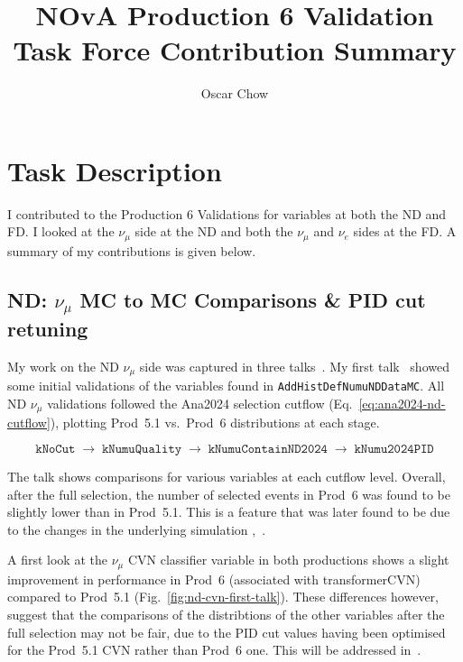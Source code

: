 \documentclass{article}
\title{NOvA Production 6 Validation Task Force Contribution Summary}
\author{Oscar Chow}
\begin{document}
\maketitle

\section{Task Description}
I contributed to the Production 6 Validations for variables at both the ND and FD.
I looked at the $\nu_{\mu}$ side at the ND and both the $\nu_{\mu}$ and $\nu_e$ sides at the FD.
A summary of my contributions is given below.

\subsection{ND: \texorpdfstring{$\nu_\mu$}{numu} MC to MC Comparisons \& PID cut retuning}
\label{sec:nd-numu}
My work on the ND $\nu_{\mu}$ side was captured in three talks~\cite{ochow-nd-numu-init,ochow-nd-numu-mctomc,ochow-nd-numu-cvn}.
My first talk~\cite{ochow-nd-numu-init} showed some initial validations of the variables found in \texttt{AddHistDefNumuNDDataMC}.
All ND $\nu_{\mu}$ validations followed the Ana2024 selection cutflow (Eq.~\eqref{eq:ana2024-nd-cutflow}), plotting Prod~5.1 vs.\ Prod~6 distributions at each stage.

\begin{equation}
  \label{eq:ana2024-nd-cutflow}
  \texttt{kNoCut}
  \;\longrightarrow\;
  \texttt{kNumuQuality}
  \;\longrightarrow\;
  \texttt{kNumuContainND2024}
  \;\longrightarrow\;
  \texttt{kNumu2024PID}
\end{equation}

\noindent The talk shows comparisons for various variables at each cutflow level.
Overall, after the full selection, the number of selected events in Prod~6 was found to be slightly lower than in Prod~5.1.
This is a feature that was later found to be due to the changes in the underlying simulation \cite{ochow-fd-numu-sel},~\cite{tricia-xsec-prod6}.

A first look at the $\nu_{\mu}$ CVN classifier variable in both productions shows a slight improvement in performance in Prod~6 (associated with transformerCVN) compared to Prod~5.1 (Fig.~\ref{fig:nd-cvn-first-talk}).
These differences however, suggest that the comparisons of the distribtions of the other variables after the full selection may not be fair, due to the PID cut values having been optimised for the Prod~5.1 CVN rather than Prod~6 one.
This will be addressed in~\cite{ochow-nd-numu-cvn}.
\end{document}
